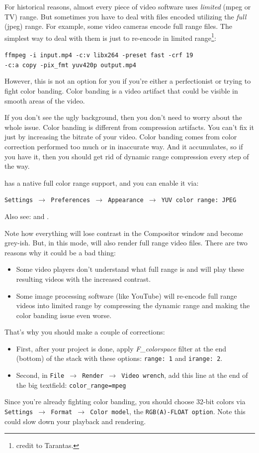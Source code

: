 For historical reasons, almost every piece of video software uses \textit{limited} (mpeg or TV) range. But sometimes you have to deal with files encoded utilizing the \textit{full} (jpeg) range. For example, some video cameras encode full range files. The simplest way to deal with them is just to re-encode in limited range\protect\footnote{credit to Tarantas.}:

\qquad \texttt{ffmpeg -i input.mp4 -c:v libx264 -preset fast -crf 19 \\
-c:a copy -pix\_fmt yuv420p output.mp4}

However, this is not an option for you if you're either a perfectionist or trying to fight color banding. Color banding is a video artifact that could be visible in smooth areas of the video.

If you don't see the ugly background, then you don't need to worry about the whole issue. Color banding is different from compression artifacts. You can't fix it just by increasing the bitrate of your video. Color banding comes from color correction performed too much or in inaccurate way. And it accumulates, so if you have it, then you should get rid of dynamic range compression every step of the way.

\CGG{} has a native full color range support, and you can enable it via:

\texttt{Settings $\rightarrow$ Preferences $\rightarrow$ Appearance $\rightarrow$ YUV color range: JPEG}

Also see:  and .

Note how everything will lose contrast in the Compositor window and become grey-ish. But, in this mode, \CGG{} will also render full range video files. There are two reasons why it could be a bad thing:

\begin{itemize}
	\item Some video players don't understand what full range is and will play these resulting videos with the increased contrast.
	\item Some image processing software (like YouTube) will re-encode full	range videos into limited range by compressing the dynamic range and making the color banding issue even worse.
\end{itemize}

That's why you should make a couple of corrections:

\begin{itemize}
	\item First, after your project is done, apply \textit{F\_colorspace} filter at the end
	(bottom) of the stack with these options: \texttt{range: 1} and \texttt{irange: 2}.
	\item Second, in \texttt{File $\rightarrow$ Render $\rightarrow$ Video wrench}, add this line at the end of the big textfield: \texttt{color\_range=mpeg}
\end{itemize}

Since you're already fighting color banding, you should choose 32-bit colors via \texttt{Settings $\rightarrow$ Format $\rightarrow$ Color model}, the \texttt{RGB(A)-FLOAT option}. Note this could slow down your playback and rendering.
